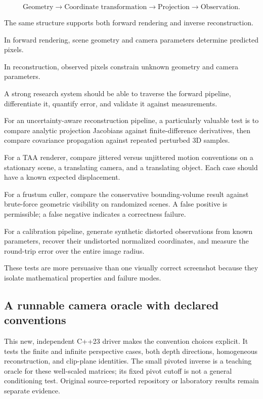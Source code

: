 \[
 \boxed{ \text{Geometry} \rightarrow \text{Coordinate transformation} \rightarrow \text{Projection} \rightarrow \text{Observation} }.
\]

The same structure supports both forward rendering and inverse reconstruction.

In forward rendering, scene geometry and camera parameters determine predicted pixels.

In reconstruction, observed pixels constrain unknown geometry and camera parameters.

A strong research system should be able to traverse the forward pipeline, differentiate it, quantify error, and validate it against measurements.

For an uncertainty-aware reconstruction pipeline, a particularly valuable test is to compare analytic projection Jacobians against finite-difference derivatives, then compare covariance propagation against repeated perturbed 3D samples.

For a TAA renderer, compare jittered versus unjittered motion conventions on a stationary scene, a translating camera, and a translating object. Each case should have a known expected displacement.

For a frustum culler, compare the conservative bounding-volume result against brute-force geometric visibility on randomized scenes. A false positive is permissible; a false negative indicates a correctness failure.

For a calibration pipeline, generate synthetic distorted observations from known parameters, recover their undistorted normalized coordinates, and measure the round-trip error over the entire image radius.

These tests are more persuasive than one visually correct screenshot because they isolate mathematical properties and failure modes.

\subsection{A runnable camera oracle with declared conventions}\label{a-runnable-camera-oracle-with-declared-conventions}

This new, independent C++23 driver makes the convention choices explicit. It tests the finite and infinite perspective cases, both depth directions, homogeneous reconstruction, and clip-plane identities. The small pivoted inverse is a teaching oracle for these well-scaled matrices; its fixed pivot cutoff is not a general conditioning test. Original source-reported repository or laboratory results remain separate evidence.


